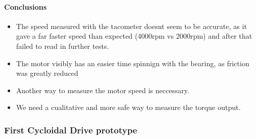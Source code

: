 \documentclass{article}
\begin{document}
\paragraph[short]{Conclusions}
\begin{itemize}
    \item The speed measured with the tacometer doesnt seem to be accurate, as it gave a far faster speed than expected (4000rpm vs 2000rpm) and after that failed to read in further tests.
    \item The motor visibly has an easier time spinnign with the bearing, as friction was greatly reduced
    \item Another way to measure the motor speed is neccessary.
    \item We need a cualitative and more safe way to measure the torque output.
\end{itemize}

\subsubsection{First Cycloidal Drive prototype}
\end{document}
